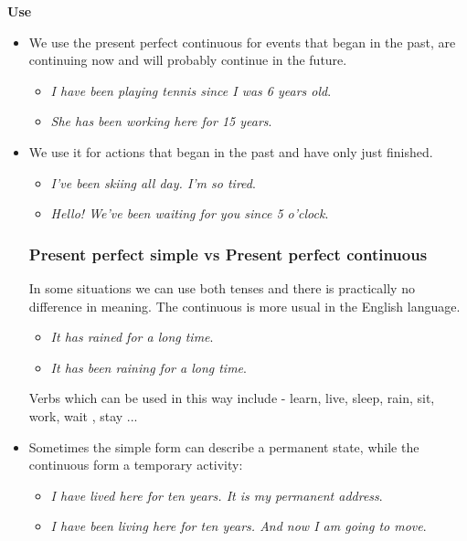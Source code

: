 \textbf{Use}

\begin{itemize}

\item We use the present perfect continuous for events that began in the past, are continuing now and will probably continue in the future.

\begin{itemize}
\item \textit{I have been playing tennis since I was 6 years old}.
\item \textit{She has been working here for 15 years}.
\end{itemize}

\item We use it for actions that began in the past and have only just finished.
\begin{itemize}
\item \textit{I've been skiing all day. I'm so tired}.
\item \textit{Hello! We've been waiting for you since 5 o'clock}.
\end{itemize}

\subsubsection{Present perfect simple vs Present perfect continuous}

In some situations we can use both tenses and there is practically no difference in meaning. The continuous is more usual in the English language.

\begin{itemize}

\item \textit{It has rained for a long time}.
\item \textit{It has been raining for a long time}.
\end{itemize}

Verbs which can be used in this way include - learn, live, sleep, rain, sit, work, wait , stay ...

\item Sometimes the simple form can describe a permanent state, while the continuous form a temporary activity:

\begin{itemize}

\item \textit{I have lived here for ten years. It is my permanent address}.
\item \textit{I have been living here for ten years. And now I am going to move}.
\end{itemize}


\end{itemize}
